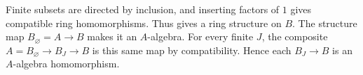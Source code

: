 Finite subsets are directed by inclusion, and inserting factors of $1$ gives compatible ring homomorphisms. Thus  gives a ring structure on $B$. The structure map $B_\varnothing=A\to B$ makes it an $A$-algebra. For every finite $J$, the composite $A=B_\varnothing\to B_J\to B$ is this same map by compatibility. Hence each $B_J\to B$ is an $A$-algebra homomorphism.
